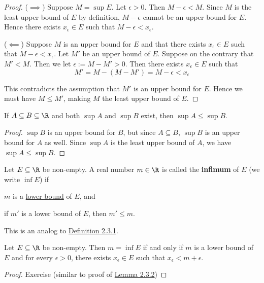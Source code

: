 \begin{proof}
  ($\implies$) Suppose $M=\sup E$. Let $\epsilon>0$. Then $M-\epsilon<M$. Since
  $M$ is the least upper bound of $E$ by definition, $M-\epsilon$ cannot be an
  upper bound for $E$. Hence there exists $x_\epsilon\in E$ such that
  $M-\epsilon<x_\epsilon$.

  ($\impliedby$) Suppose $M$ is an upper bound for $E$ and that there exists
  $x_\epsilon\in E$ such that $M-\epsilon<x_\epsilon$. Let $M'$ be an upper
  bound of $E$. Suppose on the contrary that $M'<M$. Then we let
  $\epsilon:=M-M'>0$. Then there exists $x_\epsilon\in E$ such that
  $$
    M'=M-(M-M')=M-\epsilon<x_\epsilon
  $$

  This contradicts the assumption that $M'$ is an upper bound for $E$. Hence we
  must have $M\leq M'$, making $M$ the least upper bound of $E$.
\end{proof}

\label{cd8e7c5}

If $A\subseteq B\subseteq\R$ and both $\sup A$ and $\sup B$ exist, then $\sup
A\leq\sup B$.

\begin{proof}
  $\sup B$ is an upper bound for $B$, but since $A\subseteq B$, $\sup B$ is an
  upper bound for $A$ as well. Since $\sup A$ is the least upper bound of $A$,
  we have $\sup A\leq\sup B$.
\end{proof}

\label{ff16df6}

Let $E\subseteq\R$ be non-empty. A real number $m\in\R$ is called the
\textbf{infimum} of $E$ (we write $\inf E$) if
\begin{enumerati}
  \item $m$ is a \href{e4698be}{lower bound} of $E$, and
  \item if $m'$ is a lower bound of $E$, then $m'\leq m$.
\end{enumerati}

This is an analog to \href{e6981e1}{Definition 2.3.1}.

\label{fec9bdb}

Let $E\subseteq\R$ be non-empty. Then $m=\inf E$ if and only if $m$ is a lower
bound of $E$ and for every $\epsilon>0$, there exists $x_\epsilon\in E$ such
that $x_\epsilon<m+\epsilon$.

\begin{proof}
  Exercise (similar to proof of \href{f77f162}{Lemma 2.3.2})
\end{proof}

